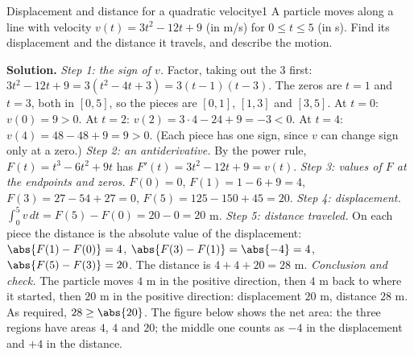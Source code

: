 \documentclass[11pt]{article}
\begin{document}
\begin{exmp}{Displacement and distance for a quadratic velocity}{e1}
A particle moves along a line with velocity $v(t)=3t^2-12t+9$ (in m/s) for $0\le t\le5$ (in s). Find its displacement and the distance it travels, and describe the motion.

\textbf{Solution.} \emph{Step 1: the sign of $v$.} Factor, taking out the $3$ first: $3t^2-12t+9=3(t^2-4t+3)=3(t-1)(t-3)$.
The zeros are $t=1$ and $t=3$, both in $[0,5]$, so the pieces are $[0,1]$, $[1,3]$ and $[3,5]$. At $t=0$: $v(0)=9>0$. At $t=2$: $v(2)=3\cdot4-24+9=-3<0$. At $t=4$: $v(4)=48-48+9=9>0$. (Each piece has one sign, since $v$ can change sign only at a zero.)
\emph{Step 2: an antiderivative.} By the power rule, $F(t)=t^3-6t^2+9t$ has $F'(t)=3t^2-12t+9=v(t)$.
\emph{Step 3: values of $F$ at the endpoints and zeros.} $F(0)=0$, $F(1)=1-6+9=4$, $F(3)=27-54+27=0$, $F(5)=125-150+45=20$.
\emph{Step 4: displacement.} $\int_0^5v\,dt=F(5)-F(0)=20-0=20$ m.
\emph{Step 5: distance traveled.} On each piece the distance is the absolute value of the displacement: $\abs{F(1)-F(0)}=4$, $\abs{F(3)-F(1)}=\abs{-4}=4$, $\abs{F(5)-F(3)}=20$. The distance is $4+4+20=28$ m.
\emph{Conclusion and check.} The particle moves $4$ m in the positive direction, then $4$ m back to where it started, then $20$ m in the positive direction: displacement $20$ m, distance $28$ m. As required, $28\ge\abs{20}$. The figure below shows the net area: the three regions have areas $4$, $4$ and $20$; the middle one counts as $-4$ in the displacement and $+4$ in the distance.


\end{exmp}
\end{document}
